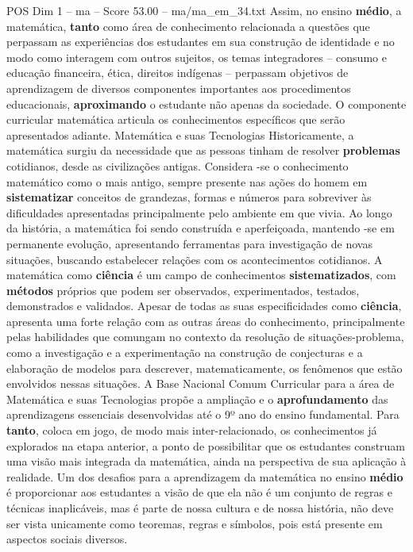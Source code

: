 \begin{textsample}{POS Dim 1 – ma – Score 53.00 – ma/ma\_em\_34.txt}
Assim, no ensino \textbf{médio}, a matemática, \textbf{tanto} como área de conhecimento relacionada a questões que perpassam as experiências dos estudantes em sua construção de identidade e no modo como interagem com outros sujeitos, os temas integradores – consumo e educação financeira, ética, direitos indígenas – perpassam objetivos de aprendizagem de diversos componentes importantes aos procedimentos educacionais, \textbf{aproximando} o estudante não apenas da sociedade.
O componente curricular matemática articula os conhecimentos específicos que serão apresentados adiante.
Matemática e suas Tecnologias Historicamente, a matemática surgiu da necessidade que as pessoas tinham de resolver \textbf{problemas} cotidianos, desde as civilizações antigas.
Considera -se o conhecimento matemático como o mais antigo, sempre presente nas ações do homem em \textbf{sistematizar} conceitos de grandezas, formas e números para sobreviver às dificuldades apresentadas principalmente pelo ambiente em que vivia.
Ao longo da história, a matemática foi sendo construída e aperfeiçoada, mantendo -se em permanente evolução, apresentando ferramentas para investigação de novas situações, buscando estabelecer relações com os acontecimentos cotidianos.
A matemática como \textbf{ciência} é um campo de conhecimentos \textbf{sistematizados}, com \textbf{métodos} próprios que podem ser observados, experimentados, testados, demonstrados e validados.
Apesar de todas as suas especificidades como \textbf{ciência}, apresenta uma forte relação com as outras áreas do conhecimento, principalmente pelas habilidades que comungam no contexto da resolução de situações-problema, como a investigação e a experimentação na construção de conjecturas e a elaboração de modelos para descrever, matematicamente, os fenômenos que estão envolvidos nessas situações.
A Base Nacional Comum Curricular para a área de Matemática e suas Tecnologias propõe a ampliação e o \textbf{aprofundamento} das aprendizagens essenciais desenvolvidas até o 9º ano do ensino fundamental.
Para \textbf{tanto}, coloca em jogo, de modo mais inter-relacionado, os conhecimentos já explorados na etapa anterior, a ponto de possibilitar que os estudantes construam uma visão mais integrada da matemática, ainda na perspectiva de sua aplicação à realidade.
Um dos desafios para a aprendizagem da matemática no ensino \textbf{médio} é proporcionar aos estudantes a visão de que ela não é um conjunto de regras e técnicas inaplicáveis, mas é parte de nossa cultura e de nossa história, não deve ser vista unicamente como teoremas, regras e símbolos, pois está presente em aspectos sociais diversos.

\end{textsample}
